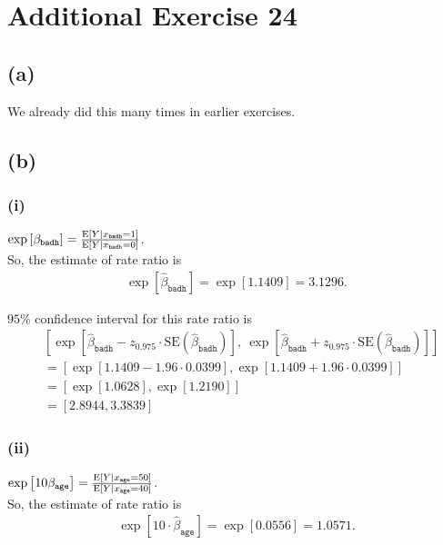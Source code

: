 \section*{Additional Exercise 24}
\subsection*{(a)}
We already did this many times in earlier exercises.

\vspace{\baselineskip}
\subsection*{(b)}
\subsubsection*{(i)}
$\exp\left[\beta_{\mathrm{\texttt{badh}}}\right] = \frac{\mathrm{E}\left[Y|x_{\mathrm{\texttt{badh}}} = 1\right]}{\mathrm{E}\left[Y|x_{\mathrm{\texttt{badh}}} = 0\right]}$.\\

So, the estimate of rate ratio is
\begin{align*}
\exp\left[\widehat{\beta}_{\mathrm{\texttt{badh}}}\right] = \exp\left[1.1409\right] = 3.1296.
\end{align*}

$95\%$ confidence interval for this rate ratio is
\begin{align*}
&\left[\exp\left[\widehat{\beta}_{\mathrm{\texttt{badh}}} - z_{0.975} \cdot \mathrm{SE}(\widehat{\beta}_{\mathrm{\texttt{badh}}})\right],~\exp\left[\widehat{\beta}_{\mathrm{\texttt{badh}}} + z_{0.975} \cdot \mathrm{SE}(\widehat{\beta}_{\mathrm{\texttt{badh}}})\right] \right]\\
&= \left[\exp[1.1409 - 1.96 \cdot 0.0399], \exp[1.1409 + 1.96 \cdot 0.0399]\right]\\
&= \left[\exp[1.0628], \exp[1.2190]\right]\\
&= [2.8944, 3.3839]
\end{align*}

\subsubsection*{(ii)}
$\exp\left[10\beta_{\mathrm{\texttt{age}}}\right] = \frac{\mathrm{E}\left[Y|x_{\mathrm{\texttt{age}}} = 50\right]}{\mathrm{E}\left[Y|x_{\mathrm{\texttt{age}}} = 40\right]}$.\\

So, the estimate of rate ratio is
\begin{align*}
\exp\left[10\cdot\widehat{\beta}_{\mathrm{\texttt{age}}}\right] = \exp\left[0.0556\right] = 1.0571.
\end{align*}

